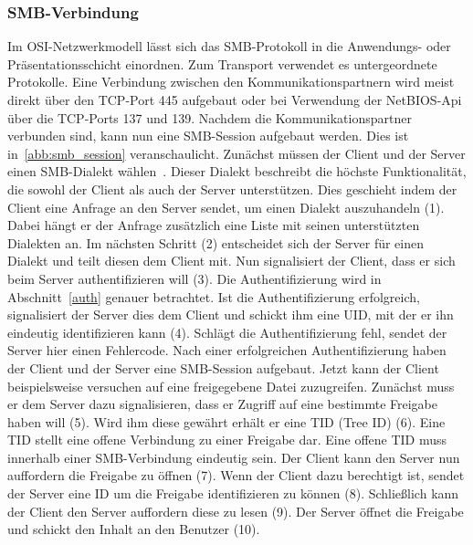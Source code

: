 \documentclass{AIFB_ITI_Crypto_Seminar}
\begin{document}
\subsubsection{SMB-Verbindung}
Im OSI-Netzwerkmodell lässt sich das SMB-Protokoll in die Anwendungs- oder Präsentationsschicht einordnen. Zum Transport verwendet es untergeordnete Protokolle. Eine Verbindung zwischen den Kommunikationspartnern wird meist direkt über den TCP-Port 445 aufgebaut oder bei Verwendung der NetBIOS-Api über die TCP-Ports 137 und 139. Nachdem die Kommunikationspartner verbunden sind, kann nun eine SMB-Session aufgebaut werden. Dies ist in~\autoref{abb:smb_session} veranschaulicht. Zunächst müssen der Client und der Server einen SMB-Dialekt wählen~\cite{smb_dialect}. Dieser Dialekt beschreibt die höchste Funktionalität, die sowohl der Client als auch der Server unterstützen. Dies geschieht indem der Client eine Anfrage an den Server sendet, um einen Dialekt auszuhandeln (1). Dabei hängt er der Anfrage zusätzlich eine Liste mit seinen unterstützten Dialekten an. Im nächsten Schritt (2) entscheidet sich der Server für einen Dialekt und teilt diesen dem Client mit. Nun signalisiert der Client, dass er sich beim Server authentifizieren will (3). Die Authentifizierung wird in Abschnitt~\ref{auth} genauer betrachtet. Ist die Authentifizierung erfolgreich, signalisiert der Server dies dem Client und schickt ihm eine UID, mit der er ihn eindeutig identifizieren kann (4). Schlägt die Authentifizierung fehl, sendet der Server hier einen Fehlercode. Nach einer erfolgreichen Authentifizierung haben der Client und der Server eine SMB-Session aufgebaut. Jetzt kann der Client beispielsweise versuchen auf eine freigegebene Datei zuzugreifen. Zunächst muss er dem Server dazu signalisieren, dass er Zugriff auf eine bestimmte Freigabe haben will (5). Wird ihm diese gewährt erhält er eine TID (Tree ID) (6). Eine TID stellt eine offene Verbindung zu einer Freigabe dar. Eine offene TID muss innerhalb einer SMB-Verbindung eindeutig sein. Der Client kann den Server nun auffordern die Freigabe zu öffnen (7). Wenn der Client dazu berechtigt ist, sendet der Server eine ID um die Freigabe identifizieren zu können (8). Schließlich kann der Client den Server auffordern diese zu lesen (9). Der Server öffnet die Freigabe und schickt den Inhalt an den Benutzer (10).
\end{document}
